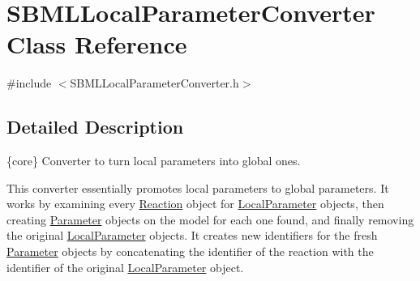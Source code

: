 \hypertarget{class_s_b_m_l_local_parameter_converter}{}\section{S\+B\+M\+L\+Local\+Parameter\+Converter Class Reference}
\label{class_s_b_m_l_local_parameter_converter}


{\ttfamily \#include $<$S\+B\+M\+L\+Local\+Parameter\+Converter.\+h$>$}



\subsection{Detailed Description}
\{core\} Converter to turn local parameters into global ones.



This converter essentially promotes local parameters to global parameters. It works by examining every \hyperlink{class_reaction}{Reaction} object for \hyperlink{class_local_parameter}{Local\+Parameter} objects, then creating \hyperlink{class_parameter}{Parameter} objects on the model for each one found, and finally removing the original \hyperlink{class_local_parameter}{Local\+Parameter} objects. It creates new identifiers for the fresh \hyperlink{class_parameter}{Parameter} objects by concatenating the identifier of the reaction with the identifier of the original \hyperlink{class_local_parameter}{Local\+Parameter} object.

